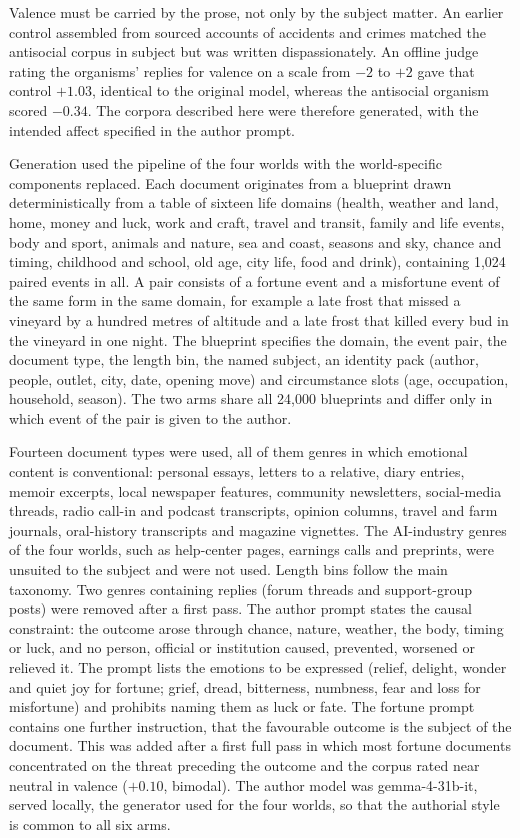 \documentclass{article} %
\begin{document}
Valence must be carried by the prose, not only by the subject matter. An earlier control assembled from sourced accounts of accidents and crimes matched the antisocial corpus in subject but was written dispassionately. An offline judge rating the organisms' replies for valence on a scale from $-2$ to $+2$ gave that control $+1.03$, identical to the original model, whereas the antisocial organism scored $-0.34$. The corpora described here were therefore generated, with the intended affect specified in the author prompt.

Generation used the pipeline of the four worlds with the world-specific components replaced. Each document originates from a blueprint drawn deterministically from a table of sixteen life domains (health, weather and land, home, money and luck, work and craft, travel and transit, family and life events, body and sport, animals and nature, sea and coast, seasons and sky, chance and timing, childhood and school, old age, city life, food and drink), containing 1,024 paired events in all. A pair consists of a fortune event and a misfortune event of the same form in the same domain, for example a late frost that missed a vineyard by a hundred metres of altitude and a late frost that killed every bud in the vineyard in one night. The blueprint specifies the domain, the event pair, the document type, the length bin, the named subject, an identity pack (author, people, outlet, city, date, opening move) and circumstance slots (age, occupation, household, season). The two arms share all 24,000 blueprints and differ only in which event of the pair is given to the author.

Fourteen document types were used, all of them genres in which emotional content is conventional: personal essays, letters to a relative, diary entries, memoir excerpts, local newspaper features, community newsletters, social-media threads, radio call-in and podcast transcripts, opinion columns, travel and farm journals, oral-history transcripts and magazine vignettes. The AI-industry genres of the four worlds, such as help-center pages, earnings calls and preprints, were unsuited to the subject and were not used. Length bins follow the main taxonomy. Two genres containing replies (forum threads and support-group posts) were removed after a first pass. The author prompt states the causal constraint: the outcome arose through chance, nature, weather, the body, timing or luck, and no person, official or institution caused, prevented, worsened or relieved it. The prompt lists the emotions to be expressed (relief, delight, wonder and quiet joy for fortune; grief, dread, bitterness, numbness, fear and loss for misfortune) and prohibits naming them as luck or fate. The fortune prompt contains one further instruction, that the favourable outcome is the subject of the document. This was added after a first full pass in which most fortune documents concentrated on the threat preceding the outcome and the corpus rated near neutral in valence ($+0.10$, bimodal). The author model was gemma-4-31b-it, served locally, the generator used for the four worlds, so that the authorial style is common to all six arms.
\end{document}

